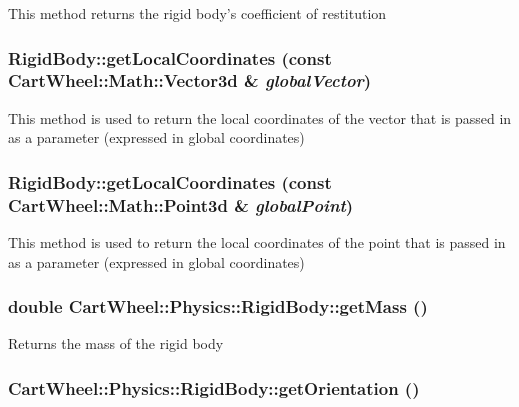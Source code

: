 This method returns the rigid body's coefficient of restitution \hypertarget{classCartWheel_1_1Physics_1_1RigidBody_a4c5e4189ad6b5ab79ffb4670cbda67e6}{
\subsubsection[{getLocalCoordinates}]{ RigidBody::getLocalCoordinates (const {\bf CartWheel::Math::Vector3d} \& {\em globalVector})}}
\label{classCartWheel_1_1Physics_1_1RigidBody_a4c5e4189ad6b5ab79ffb4670cbda67e6}
This method is used to return the local coordinates of the vector that is passed in as a parameter (expressed in global coordinates) \hypertarget{classCartWheel_1_1Physics_1_1RigidBody_a142142b4060b01345f76f6dcaab89b98}{
\subsubsection[{getLocalCoordinates}]{ RigidBody::getLocalCoordinates (const {\bf CartWheel::Math::Point3d} \& {\em globalPoint})}}
\label{classCartWheel_1_1Physics_1_1RigidBody_a142142b4060b01345f76f6dcaab89b98}
This method is used to return the local coordinates of the point that is passed in as a parameter (expressed in global coordinates) \hypertarget{classCartWheel_1_1Physics_1_1RigidBody_a1371aa6d98aa5d78be4cf797905ffc04}{
\subsubsection[{getMass}]{\setlength{\rightskip}{0pt plus 5cm}double CartWheel::Physics::RigidBody::getMass ()}}
\label{classCartWheel_1_1Physics_1_1RigidBody_a1371aa6d98aa5d78be4cf797905ffc04}
Returns the mass of the rigid body \hypertarget{classCartWheel_1_1Physics_1_1RigidBody_ad2e28d46c26b424c287b39939f9ff3c1}{
\subsubsection[{getOrientation}]{ CartWheel::Physics::RigidBody::getOrientation ()}}
